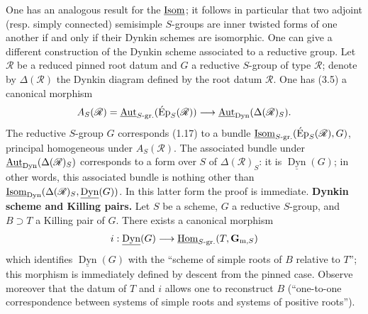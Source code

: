 One has an analogous result for the $\underline{\operatorname{Isom}}$; it follows in particular that two adjoint (resp. simply connected) semisimple $S$-groups are inner twisted forms of one another if and only if their Dynkin schemes are isomorphic.
\label{XXIV.3.7}
One can give a different construction of the Dynkin scheme associated to a reductive group. Let $\mathscr R$ be a reduced pinned root datum and $G$ a reductive $S$-group of type $\mathscr R$; denote by $\Delta(\mathscr R)$ the Dynkin diagram defined by the root datum $\mathscr R$. One has (3.5) a canonical morphism
\[
A_S(\mathscr R)=\underline{\operatorname{Aut}}_{S\text{-gr.}}(\operatorname{\acute Ep}_S(\mathscr R))\longrightarrow\underline{\operatorname{Aut}}_{\mathrm{Dyn}}(\Delta(\mathscr R)_S).
\]
The reductive $S$-group $G$ corresponds (1.17) to a bundle $\underline{\operatorname{Isom}}_{S\text{-gr.}}(\operatorname{\acute Ep}_S(\mathscr R),G)$, principal homogeneous under $A_S(\mathscr R)$. The associated bundle under $\underline{\operatorname{Aut}}_{\mathrm{Dyn}}(\Delta(\mathscr R)_S)$ corresponds to a form over $S$ of $\Delta(\mathscr R)_S$: it is $\underline{\operatorname{Dyn}}(G)$; in other words, this associated bundle is nothing other than $\underline{\operatorname{Isom}}_{\mathrm{Dyn}}(\Delta(\mathscr R)_S,\underline{\operatorname{Dyn}}(G))$. In this latter form the proof is immediate.
\label{XXIV.3.8}\textbf{Dynkin scheme and Killing pairs.}
Let $S$ be a scheme, $G$ a reductive $S$-group, and $B\supset T$ a Killing pair of $G$. There exists a canonical morphism
\[
i:\underline{\operatorname{Dyn}}(G)\longrightarrow\underline{\operatorname{Hom}}_{S\text{-gr.}}(T,\mathbf G_{\mathrm m,S})
\]
which identifies $\underline{\operatorname{Dyn}}(G)$ with the ``scheme of simple roots of $B$ relative to $T$''; this morphism is immediately defined by descent from the pinned case. Observe moreover that the datum of $T$ and $i$ allows one to reconstruct $B$ (``one-to-one correspondence between systems of simple roots and systems of positive roots'').

